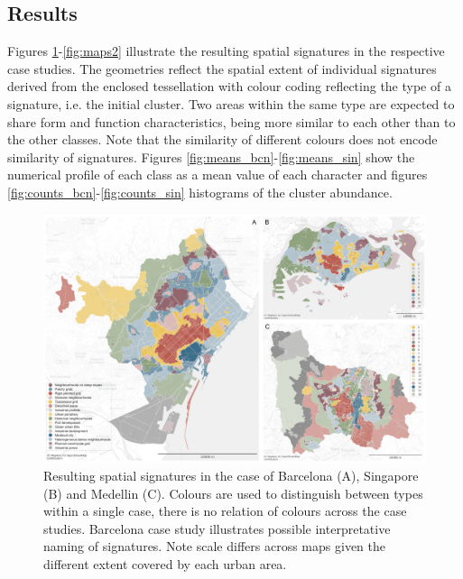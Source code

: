 \subsection{Results}

Figures \ref{fig:maps1}-\ref{fig:maps2} illustrate the resulting spatial signatures in the respective case
studies. The geometries reflect the spatial extent of individual signatures
derived from the enclosed tessellation
with colour coding reflecting the type of a signature, i.e. the initial cluster. Two
areas within the same type are expected to share form and function characteristics, being more similar to each other than to the
other classes. Note that the similarity of different colours does not encode
similarity of signatures. Figures \ref{fig:means_bcn}-\ref{fig:means_sin} show the numerical
profile of each class as a mean value of each character and figures \ref{fig:counts_bcn}-\ref{fig:counts_sin}
histograms of the cluster abundance.

\begin{figure}
    \includegraphics[width=\linewidth]{figures/maps1.png}
    \caption{Resulting spatial signatures in the case of Barcelona (A), Singapore (B)
    and Medellin (C). Colours are used to distinguish between types within a
    single case, there is no relation of colours across the case studies. Barcelona
    case study illustrates possible interpretative naming of signatures.
    Note scale differs across maps given the different extent
    covered by each urban area.}
    \label{fig:maps1}
\end{figure}


